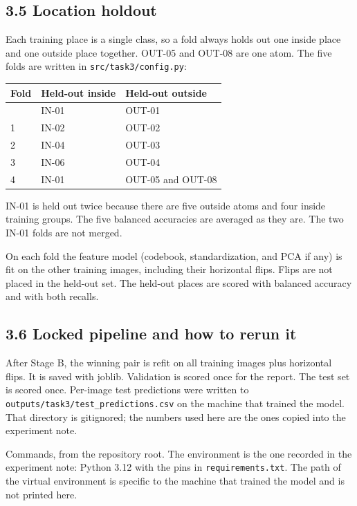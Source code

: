 \documentclass[11pt,a4paper]{article}
\newcounter{none}
\begin{document}
\subsection{3.5 Location holdout}\label{location-holdout}

Each training place is a single class, so a fold always holds out one inside place and one outside place together. OUT-05 and OUT-08 are one atom. The five folds are written in \texttt{src/\allowbreak{}task3/\allowbreak{}config.py}:

{\def\LTcaptype{none} %
\begin{longtable}[]{@{}lll@{}}
\toprule\noalign{}
Fold & Held-out inside & Held-out outside \\
\midrule\noalign{}
\endhead
\bottomrule\noalign{}
\endlastfoot
0 & IN-01 & OUT-01 \\
1 & IN-02 & OUT-02 \\
2 & IN-04 & OUT-03 \\
3 & IN-06 & OUT-04 \\
4 & IN-01 & OUT-05 and OUT-08 \\
\end{longtable}
}

IN-01 is held out twice because there are five outside atoms and four inside training groups. The five balanced accuracies are averaged as they are. The two IN-01 folds are not merged.

On each fold the feature model (codebook, standardization, and PCA if any) is fit on the other training images, including their horizontal flips. Flips are not placed in the held-out set. The held-out places are scored with balanced accuracy and with both recalls.

\subsection{3.6 Locked pipeline and how to rerun it}\label{locked-pipeline-and-how-to-rerun-it}

After Stage B, the winning pair is refit on all training images plus horizontal flips. It is saved with joblib. Validation is scored once for the report. The test set is scored once. Per-image test predictions were written to \texttt{outputs/\allowbreak{}task3/\allowbreak{}test\_\allowbreak{}predictions.csv} on the machine that trained the model. That directory is gitignored; the numbers used here are the ones copied into the experiment note.

Commands, from the repository root. The environment is the one recorded in the experiment note: Python 3.12 with the pins in \texttt{requirements.txt}. The path of the virtual environment is specific to the machine that trained the model and is not printed here.
\end{document}
